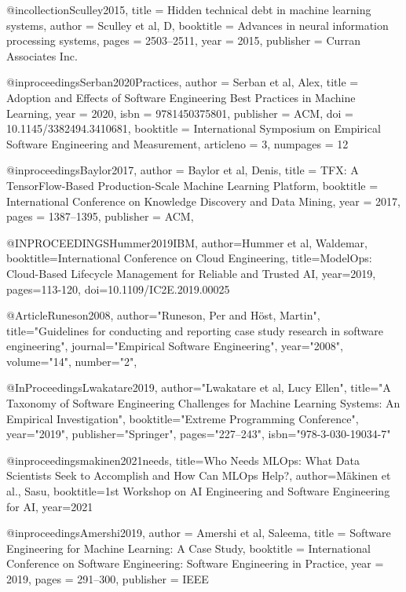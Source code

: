 \documentclass{IEEEcsmag}
\begin{document}
@incollection{Sculley2015,
title = {Hidden technical debt in machine learning systems},
author = {Sculley et al, D},
booktitle = {Advances in neural information processing systems},
pages = {2503--2511},
year = {2015},
publisher = {Curran Associates Inc.}
}

@inproceedings{Serban2020Practices,
author = {Serban et al, Alex},
title = {Adoption and Effects of Software Engineering Best Practices in Machine Learning},
year = {2020},
isbn = {9781450375801},
publisher = {ACM},
doi = {10.1145/3382494.3410681},
booktitle = {International Symposium on Empirical Software Engineering and Measurement},
articleno = {3},
numpages = {12}
}





@inproceedings{Baylor2017,
 author = {Baylor et al, Denis},
 title = {{TFX}: A TensorFlow-Based Production-Scale Machine Learning Platform},
 booktitle = {International Conference on Knowledge Discovery and Data Mining},
 year = {2017},
 pages = {1387--1395},
 publisher = {ACM},}

  


@INPROCEEDINGS{Hummer2019IBM,
  author={Hummer et al, Waldemar},
  booktitle={International Conference on Cloud Engineering}, 
  title={Model{O}ps: Cloud-Based Lifecycle Management for Reliable and Trusted {AI}}, 
  year={2019},
  pages={113-120},
  doi={10.1109/IC2E.2019.00025}}
  




@Article{Runeson2008,
author="Runeson, Per
and H{\"o}st, Martin",
title="Guidelines for conducting and reporting case study research in software engineering",
journal="Empirical Software Engineering",
year="2008",
volume="14",
number="2",}


@InProceedings{Lwakatare2019,
author="Lwakatare et al, Lucy Ellen",
title="A Taxonomy of Software Engineering Challenges for Machine Learning Systems: An Empirical Investigation",
booktitle="Extreme Programming Conference",
year="2019",
publisher="Springer",
pages="227--243",
isbn="978-3-030-19034-7"
}

@inproceedings{makinen2021needs,
  title={Who Needs {MLO}ps: What Data Scientists Seek to Accomplish and How Can {MLOp}s Help?},
  author={M{\"a}kinen et al., Sasu},
  booktitle={1st Workshop on AI Engineering and Software Engineering for {AI}},
  year={2021}
}

@inproceedings{Amershi2019,
 author = {Amershi et al, Saleema},
 title = {Software Engineering for Machine Learning: A Case Study},
 booktitle = {International Conference on Software Engineering: Software Engineering in Practice},
 year = {2019},
 pages = {291--300},
 publisher = {IEEE}
}
\end{document}
